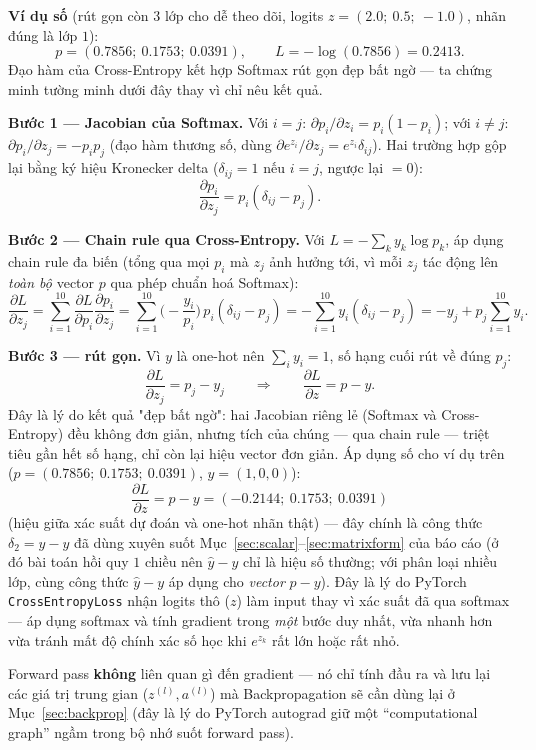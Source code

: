 \documentclass[12pt,a4paper]{article}
\begin{document}
\textbf{Ví dụ số} (rút gọn còn $3$ lớp cho dễ theo dõi, logits
$z=(2.0;\ 0.5;\ -1.0)$, nhãn đúng là lớp $1$):
$$p = (0.7856;\ 0.1753;\ 0.0391), \qquad L=-\log(0.7856)=0.2413.$$
Đạo hàm của Cross-Entropy kết hợp Softmax rút gọn đẹp bất ngờ --- ta chứng
minh tường minh dưới đây thay vì chỉ nêu kết quả.

\textbf{Bước 1 --- Jacobian của Softmax.} Với $i=j$:
$\partial p_i/\partial z_i = p_i(1-p_i)$; với $i\ne j$:
$\partial p_i/\partial z_j = -p_ip_j$ (đạo hàm thương số, dùng
$\partial e^{z_i}/\partial z_j=e^{z_i}\delta_{ij}$). Hai trường hợp gộp
lại bằng ký hiệu Kronecker delta ($\delta_{ij}=1$ nếu $i=j$, ngược lại
$=0$):
$$\frac{\partial p_i}{\partial z_j} = p_i(\delta_{ij}-p_j).$$

\textbf{Bước 2 --- Chain rule qua Cross-Entropy.} Với
$L=-\sum_k y_k\log p_k$, áp dụng chain rule đa biến (tổng qua mọi $p_i$ mà
$z_j$ ảnh hưởng tới, vì mỗi $z_j$ tác động lên \emph{toàn bộ} vector $p$
qua phép chuẩn hoá Softmax):
$$\frac{\partial L}{\partial z_j} = \sum_{i=1}^{10}\frac{\partial L}{\partial p_i}\frac{\partial p_i}{\partial z_j}
= \sum_{i=1}^{10}\Big(-\frac{y_i}{p_i}\Big)\,p_i(\delta_{ij}-p_j)
= -\sum_{i=1}^{10} y_i(\delta_{ij}-p_j)
= -y_j + p_j\sum_{i=1}^{10}y_i.$$

\textbf{Bước 3 --- rút gọn.} Vì $y$ là one-hot nên $\sum_i y_i=1$, số hạng
cuối rút về đúng $p_j$:
$$\boxed{\frac{\partial L}{\partial z_j} = p_j - y_j} \qquad\Longrightarrow\qquad \frac{\partial L}{\partial z} = p - y.$$
Đây là lý do kết quả "đẹp bất ngờ": hai Jacobian riêng lẻ (Softmax và
Cross-Entropy) đều không đơn giản, nhưng tích của chúng --- qua chain rule
--- triệt tiêu gần hết số hạng, chỉ còn lại hiệu vector đơn giản. Áp dụng
số cho ví dụ trên ($p=(0.7856;\ 0.1753;\ 0.0391)$, $y=(1,0,0)$):
$$\frac{\partial L}{\partial z} = p - y = (-0.2144;\ 0.1753;\ 0.0391)$$
(hiệu giữa xác suất dự đoán và one-hot nhãn thật) --- đây chính là công
thức $\delta_2=\hat y-y$ đã dùng xuyên suốt Mục~\ref{sec:scalar}--\ref{sec:matrixform}
của báo cáo (ở đó bài toán hồi quy $1$ chiều nên $\hat y-y$ chỉ là hiệu
số thường; với phân loại nhiều lớp, cùng công thức $\hat y-y$ áp dụng cho
\emph{vector} $p-y$). Đây là lý do PyTorch \texttt{CrossEntropyLoss} nhận
logits thô ($z$) làm input thay vì xác suất đã qua softmax --- áp dụng
softmax và tính gradient trong \emph{một} bước duy nhất, vừa nhanh hơn
vừa tránh mất độ chính xác số học khi $e^{z_k}$ rất lớn hoặc rất nhỏ.

Forward pass \textbf{không} liên quan gì đến gradient --- nó chỉ tính đầu
ra và lưu lại các giá trị trung gian ($z^{(l)}, a^{(l)}$) mà Backpropagation
sẽ cần dùng lại ở Mục~\ref{sec:backprop} (đây là lý do PyTorch autograd giữ
một ``computational graph'' ngầm trong bộ nhớ suốt forward pass).
\end{document}
